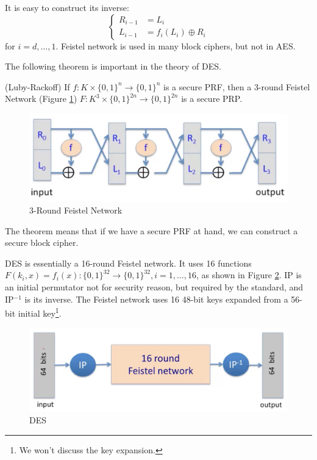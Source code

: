 It is easy to construct its inverse:
\begin{equation*}\begin{cases}
R_{i-1}&=L_i\\
L_{i-1}&=f_i(L_i)\oplus R_i
\end{cases}\end{equation*}
for $i=d,\dots,1$. Feistel network is used in many block ciphers, but not in AES.

The following theorem is important in the theory of DES. 
\begin{theorem}(Luby-Rackoff)\label{lubyrackoff}
If $f:K\times\{0,1\}^n\rightarrow\{0,1\}^n$ is a secure PRF, then a 3-round Feistel Network (Figure \ref{3rfeistel}) $F:K^3\times\{0,1\}^{2n}\rightarrow\{0,1\}^{2n}$ is a secure PRP.
\end{theorem}
\begin{figure}[ht]
\centering
\includegraphics[width=\textwidth]{3rfeistel.jpg}
\caption{3-Round Feistel Network}\label{3rfeistel}
\end{figure}
The theorem means that if we have a secure PRF at hand, we can construct a secure block cipher.

DES is essentially a 16-round Feistel network. It uses 16 functions $F(k_i,x)=f_i(x):\{0,1\}^{32}\rightarrow\{0,1\}^{32},i=1,\dots,16$, as shown in Figure \ref{des}. IP is an initial permutator not for security reason, but required by the standard, and IP$^{-1}$ is its inverse. The Feistel network uses 16 48-bit keys expanded from a 56-bit initial key\footnote{We won't discuss the key expansion.}.
\begin{figure}[ht]
\centering
\includegraphics[width=\textwidth]{DES.jpg}
\caption{DES}\label{des}
\end{figure}
